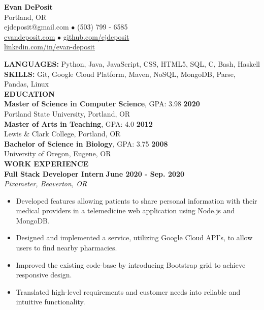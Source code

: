 \documentclass[11pt]{article}
\begin{document}
\thispagestyle{empty}
\begin{center}
\noindent \Large{\textbf{Evan DePosit}}\\
\large{Portland, OR}\\
\large{ejdeposit@gmail.com $\bullet$ (503) 799 - 6585}\\
\href{http://evandeposit.com}{\large{evandeposit.com}} $\bullet$
\href{http://github.com/ejdeposit}{\large{github.com/ejdeposit}}\\
\href{http://www.linkedin.com/in/evan-deposit}{\large{linkedin.com/in/evan-deposit}}
\end{center}
\medskip
\textbf{LANGUAGES:} Python,  Java, JavaScript, CSS, HTML5, SQL,  C, Bash, Haskell\medskip \\
\textbf{SKILLS:} Git, Google Cloud Platform, Maven, NoSQL, MongoDB, Parse, Pandas, Linux\bigskip\\
\noindent
\makebox[0pt][l]{\rule[-.2\baselineskip]{\linewidth}{.3mm}}%
\large{\textbf{EDUCATION}} \smallskip \\
%
\textbf{Master of Science in Computer Science}, GPA: 3.98
\hfill \textbf{2020}\\ 
Portland State University, Portland, OR
\medskip \\
%
\textbf{Master of Arts in Teaching}, GPA: 4.0
\hfill \textbf{2012}\\
Lewis \& Clark College, Portland, OR
\medskip \\
%
\textbf{Bachelor of Science in Biology}, GPA: 3.75
\hfill \textbf{2008}\\
University of Oregon, Eugene, OR
\bigskip\\
\makebox[0pt][l]{\rule[-.2\baselineskip]{\linewidth}{.3mm}}%
\large{\textbf{WORK EXPERIENCE}}\smallskip \\
%
\textbf{Full Stack Developer Intern} \hfill \textbf{June 2020 - Sep. 2020}\\
\textsl{Pixameter, Beaverton, OR} 
\begin{itemize}[leftmargin=*, itemsep=0pt, topsep=5pt]
	\item Developed features allowing patients to share personal information with their medical providers in a telemedicine web application using Node.js and MongoDB.
	\item Designed and implemented a service, utilizing Google Cloud API's, to allow users to find nearby pharmacies.
	\item Improved the existing code-base by introducing Bootstrap grid to achieve responsive design.
	\item Translated high-level requirements and customer needs into reliable and intuitive functionality.
\end{itemize}
\end{document}
